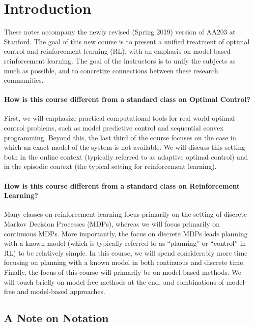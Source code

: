 \section*{Introduction}

These notes accompany the newly revised (Spring 2019) version of AA203 at Stanford. The goal of this new course is to present a unified treatment of optimal control and reinforcement learning (RL), with an emphasis on model-based reinforcement learning. The goal of the instructors is to unify the subjects as much as possible, and to concretize connections between these research communities. 

\paragraph{How is this course different from a standard class on Optimal Control?} 
First, we will emphasize practical computational tools for real world optimal control problems, such as model predictive control and sequential convex programming. Beyond this, the last third of the course focuses on the case in which an exact model of the system is not available. We will discuss this setting both in the online context (typically referred to as adaptive optimal control) and in the episodic context (the typical setting for reinforcement learning). 

\paragraph{How is this course different from a standard class on Reinforcement Learning?}
Many classes on reinforcement learning focus primarily on the setting of discrete Markov Decision Processes (MDPs), whereas we will focus primarily on continuous MDPs. More importantly, the focus on discrete MDPs leads planning with a known model (which is typically referred to as ``planning'' or ``control'' in RL) to be relatively simple. In this course, we will spend considerably more time focusing on planning with a known model in both continuous and discrete time. Finally, the focus of this course will primarily be on model-based methods. We will touch briefly on model-free methods at the end, and combinations of model-free and model-based approaches. 

\subsection*{A Note on Notation}

